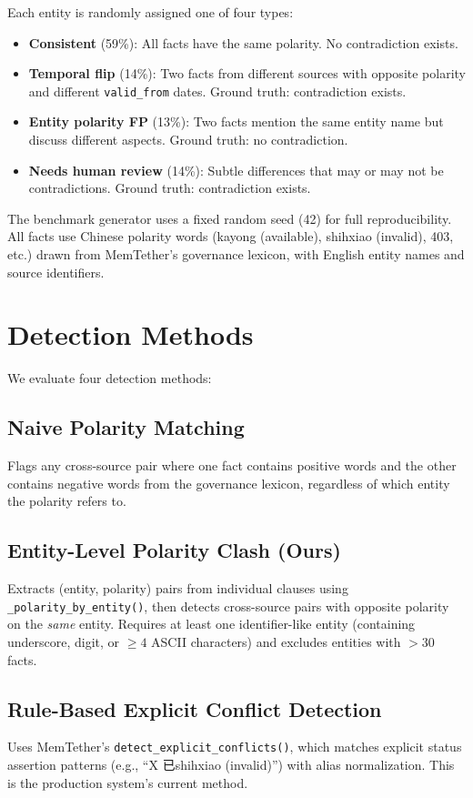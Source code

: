 \documentclass{article}
\begin{document}
Each entity is randomly assigned one of four types:
\begin{itemize}
\item \textbf{Consistent} (59\%): All facts have the same polarity. No contradiction exists.
\item \textbf{Temporal flip} (14\%): Two facts from different sources with opposite polarity and different \texttt{valid\_from} dates. Ground truth: contradiction exists.
\item \textbf{Entity polarity FP} (13\%): Two facts mention the same entity name but discuss different aspects. Ground truth: no contradiction.
\item \textbf{Needs human review} (14\%): Subtle differences that may or may not be contradictions. Ground truth: contradiction exists.
\end{itemize}

The benchmark generator uses a fixed random seed (42) for full reproducibility. All facts use Chinese polarity words (kayong (available), shihxiao (invalid), 403, etc.) drawn from MemTether's governance lexicon, with English entity names and source identifiers.

\section{Detection Methods}
\label{sec:methods}

We evaluate four detection methods:

\subsection{Naive Polarity Matching}
Flags any cross-source pair where one fact contains positive words and the other contains negative words from the governance lexicon, regardless of which entity the polarity refers to.

\subsection{Entity-Level Polarity Clash (Ours)}
Extracts (entity, polarity) pairs from individual clauses using \texttt{\_polarity\_by\_entity()}, then detects cross-source pairs with opposite polarity on the \emph{same} entity. Requires at least one identifier-like entity (containing underscore, digit, or $\geq 4$ ASCII characters) and excludes entities with $>30$ facts.

\subsection{Rule-Based Explicit Conflict Detection}
Uses MemTether's \texttt{detect\_explicit\_conflicts()}, which matches explicit status assertion patterns (e.g., ``X 已shihxiao (invalid)'') with alias normalization. This is the production system's current method.
\end{document}
